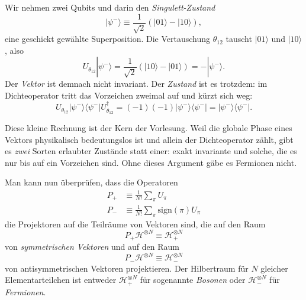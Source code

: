 \begin{beispiel}
  Wir nehmen zwei Qubits und darin den \emph{Singulett-Zustand}
  \begin{equation}
    |\psi^-\rangle \equiv \frac{1}{\sqrt{2}}\left(|01\rangle - |10\rangle\right),
  \end{equation}
  eine geschickt gewählte Superposition. Die Vertauschung $\theta_{12}$ tauscht $|01\rangle$ und $|10\rangle$, also
  \begin{equation}
    U_{\theta_{12}}|\psi^-\rangle = \frac{1}{\sqrt{2}}\left(|10\rangle - |01\rangle\right) = -|\psi^-\rangle.
  \end{equation}
  Der \emph{Vektor} ist demnach nicht invariant. Der \emph{Zustand} ist es trotzdem: im Dichteoperator tritt das Vorzeichen zweimal auf und kürzt sich weg:
  \begin{equation}
    U_{\theta_{12}}|\psi^-\rangle\langle \psi^-|U_{\theta_{12}}^\dagger = (-1)(-1)|\psi^-\rangle\langle \psi^-| = |\psi^-\rangle\langle \psi^-|.
  \end{equation}
\end{beispiel}

Diese kleine Rechnung ist der Kern der Vorlesung. Weil die globale Phase eines Vektors physikalisch bedeutungslos ist und allein der Dichteoperator zählt, gibt es \emph{zwei} Sorten erlaubter Zustände statt einer: exakt invariante und solche, die es nur bis auf ein Vorzeichen sind. Ohne dieses Argument gäbe es Fermionen nicht.

Man kann nun überprüfen, dass die Operatoren
\begin{align}
  P_{+} &\equiv \frac{1}{N!}\sum_{\pi} U_\pi \\
  P_{-} &\equiv \frac{1}{N!}\sum_{\pi} \text{sign}(\pi)U_\pi 
\end{align}
die Projektoren auf die Teilräume von Vektoren sind, die auf den
Raum 
\begin{equation}
  P_{+}\mathcal{H}^{\otimes N} \equiv \mathcal{H}^{\otimes N}_{+}
\end{equation}
von \emph{symmetrischen Vektoren} und auf den Raum
\begin{equation}
  P_{-}\mathcal{H}^{\otimes N} \equiv \mathcal{H}^{\otimes N}_{-}
\end{equation}
von antisymmetrischen Vektoren projektieren. Der Hilbertraum für $N$ gleicher Elementarteilchen ist entweder $\mathcal{H}^{\otimes N}_{+}$ für sogenannte \emph{Bosonen} oder $\mathcal{H}^{\otimes N}_{-}$ für \emph{Fermionen}.

